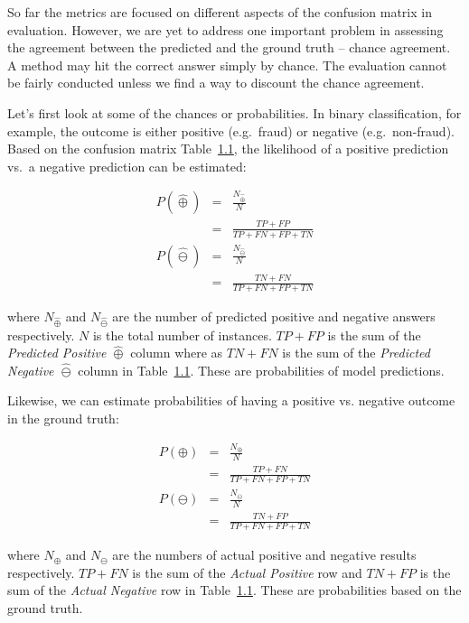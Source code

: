 \documentclass[
  letterpaper,
]{scrbook}
\begin{document}
So far the metrics are focused on different aspects of the confusion
matrix in evaluation. However, we are yet to address one important
problem in assessing the agreement between the predicted and the ground
truth -- chance agreement. A method may hit the correct answer simply by
chance. The evaluation cannot be fairly conducted unless we find a way
to discount the chance agreement.

Let's first look at some of the chances or probabilities. In binary
classification, for example, the outcome is either positive (e.g.~fraud)
or negative (e.g.~non-fraud). Based on the confusion matrix
Table~\hyperref[tab-eval-cmatrix]{1.1}, the likelihood of a positive
prediction vs.~a negative prediction can be estimated:

\[\begin{aligned}
  P(\hat{\oplus})
  & = & \frac{N_{\hat{ \oplus}}}{N} \\
  & = & \frac{TP + FP}{TP + FN + FP + TN} \\
  P(\hat{\ominus})
  & = & \frac{N_{\hat{\ominus}}}{N} \\
  & = & \frac{TN + FN}{TP + FN + FP + TN}
\end{aligned}\]

where \(N_{\hat{\oplus}}\) and \(N_{\hat{\ominus}}\) are the number of
predicted positive and negative answers respectively. \(N\) is the total
number of instances. \(TP+FP\) is the sum of the \emph{Predicted
Positive \(\hat{\oplus}\)} column where as \(TN+FN\) is the sum of the
\emph{Predicted Negative \(\hat{\ominus}\)} column in
Table~\hyperref[tab-eval-cmatrix]{1.1}. These are probabilities of model
predictions.

Likewise, we can estimate probabilities of having a positive vs.
negative outcome in the ground truth:

\[\begin{aligned}
  P(\oplus)
  & = & \frac{N_{\oplus}}{N} \\
  & = & \frac{TP + FN}{TP + FN + FP + TN} \\
  P(\ominus)
  & = & \frac{N_{\ominus}}{N}  \\
  & = & \frac{TN + FP}{TP + FN + FP + TN}
\end{aligned}\]

where \(N_{\oplus}\) and \(N_{\ominus}\) are the numbers of actual
positive and negative results respectively. \(TP+FN\) is the sum of the
\emph{Actual Positive} row and \(TN+FP\) is the sum of the \emph{Actual
Negative} row in Table~\hyperref[tab-eval-cmatrix]{1.1}. These are
probabilities based on the ground truth.
\end{document}
